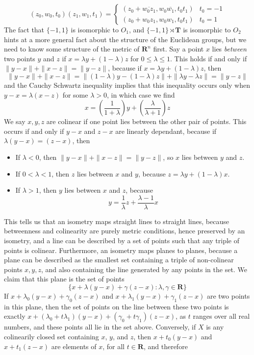 %
\[ (z_0,w_0,t_0)(z_1,w_1,t_1) = \begin{cases} (z_0 + \overline{w_0z_1},w_0\overline{w_1},t_0t_1) & t_0 = -1 \\ (z_0 + w_0z_1,w_0w_1, t_0t_1) & t_0 = 1 \end{cases} \]
%
The fact that $\{ -1, 1 \}$ is isomorphic to $O_1$, and $\{ -1, 1 \} \rtimes \mathbf{T}$ is isomorphic to $O_2$ hints at a more general fact about the structure of the Euclidean groups, but we need to know some structure of the metric of $\mathbf{R}^n$ first. Say a point $x$ lies {\it between} two points $y$ and $z$ if $x = \lambda y + (1 - \lambda)z$ for $0 \leq \lambda \leq 1$. This holds if and only if $\| y - x \| + \| x - z \| = \| y - z \|$, because if $x = \lambda y + (1 - \lambda) z$, then
%
\[ \| y - x \| + \| x - z \| = \|(1 - \lambda)y - (1 - \lambda)z \| + \| \lambda y - \lambda z \| = \| y - z \| \]
%
and the Cauchy Schwartz inequality implies that this inequality occurs only when $y - x = \lambda (x - z)$ for some $\lambda > 0$, in which case we find
%
\[ x = \left( \frac{1}{1 + \lambda} \right) y + \left( \frac{\lambda}{\lambda + 1} \right) z \]
%
We say $x,y,z$ are colinear if one point lies between the other pair of points. This occurs if and only if $y - x$ and $z - x$ are linearly dependant, because if $\lambda (y - x) = (z - x)$, then
%
\begin{itemize}
    \item If $\lambda < 0$, then $\| y - x \| + \| x - z \| = \| y - z \|$, so $x$ lies between $y$ and $z$.
    \item If $0 < \lambda < 1$, then $z$ lies between $x$ and $y$, because $z = \lambda y + (1 - \lambda) x$.
    \item If $\lambda > 1$, then $y$ lies between $x$ and $z$, because
    \[ y = \frac{1}{\lambda} z + \frac{\lambda - 1}{\lambda} x \]
\end{itemize}
%
This tells us that an isometry maps straight lines to straight lines, because betweenness and colinearity are purely metric conditions, hence preserved by an isometry, and a line can be described by a set of points such that any triple of points is colinear. Furthermore, an isometry maps planes to planes, because a plane can be described as the smallest set containing a triple of non-colinear points $x,y,z$, and also containing the line generated by any points in the set. We claim that this plane is the set of points
%
\[ \{ x + \lambda (y - x) + \gamma (z - x) : \lambda, \gamma \in \mathbf{R} \} \]
%
If $x + \lambda_0 (y - x) + \gamma_0 (z - x)$ and $x + \lambda_1 (y - x) + \gamma_1 (z - x)$ are two points in this plane, then the set of points on the line between these two points is exactly $x + (\lambda_0 + t \lambda_1) (y - x) + (\gamma_0 + t \gamma_1) (z - x)$, as $t$ ranges over all real numbers, and these points all lie in the set above. Conversely, if $X$ is any colinearily closed set containing $x$, $y$, and $z$, then $x + t_0 (y - x)$ and $x + t_1 (z - x)$ are elements of $x$, for all $t \in \mathbf{R}$, and therefore
